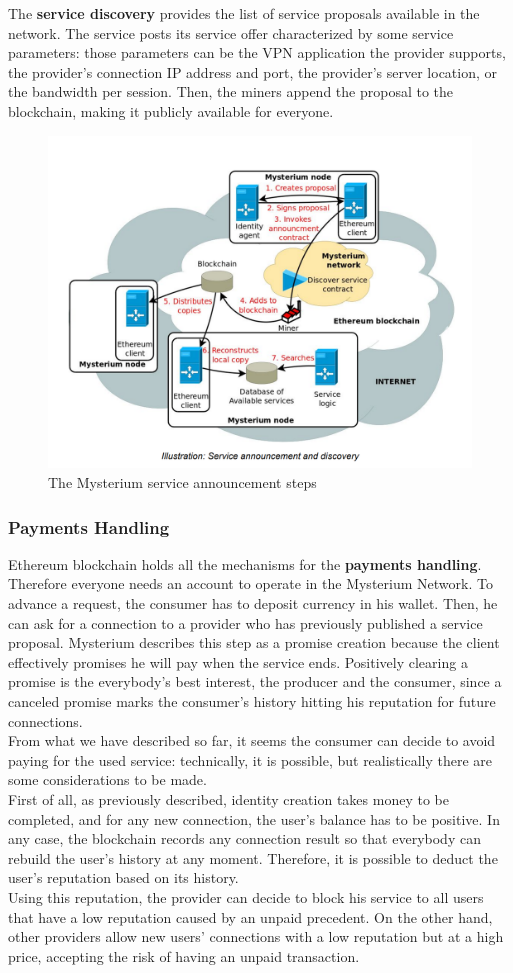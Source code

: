\documentclass[]{article}
\begin{document}
	The \textbf{service discovery} provides the list of service proposals available in the network. The service posts its service offer characterized by some service parameters: those parameters can be the VPN application the provider supports, the provider's connection IP address and port, the provider's server location, or the bandwidth per session. Then, the miners append the proposal to the blockchain, making it publicly available for everyone.\\

	\begin{figure}
		\includegraphics[width=0.5\linewidth]{"images/mysterium_service_announcement.png"}
		\caption{The Mysterium service announcement steps}
	\end{figure}
	
	\subsubsection{Payments Handling}

	Ethereum blockchain holds all the mechanisms for the \textbf{payments handling}. Therefore everyone needs an account to operate in the Mysterium Network. To advance a request, the consumer has to deposit currency in his wallet. Then, he can ask for a connection to a provider who has previously published a service proposal. Mysterium describes this step as a promise creation because the client effectively promises he will pay when the service ends. Positively clearing a promise is the everybody's best interest, the producer and the consumer, since a canceled promise marks the consumer's history hitting his reputation for future connections.\\
	From what we have described so far, it seems the consumer can decide to avoid paying for the used service: technically, it is possible, but realistically there are some considerations to be made.\\
	First of all, as previously described, identity creation takes money to be completed, and for any new connection, the user's balance has to be positive. In any case, the blockchain records any connection result so that everybody can rebuild the user's history at any moment. Therefore, it is possible to deduct the user's reputation based on its history.\\
	Using this reputation, the provider can decide to block his service to all users that have a low reputation caused by an unpaid precedent. On the other hand, other providers allow new users' connections with a low reputation but at a high price, accepting the risk of having an unpaid transaction.\\
	
\end{document}
